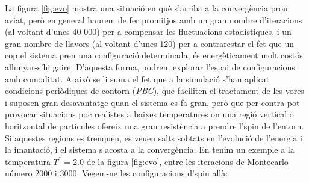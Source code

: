 \documentclass[a4paper]{article}
\begin{document}
La figura \ref{fig:evo} mostra una situació en què s'arriba a la convergència prou aviat, però en general haurem de fer promitjos amb un gran nombre d'iteracions (al voltant d'unes 40 000) per a compensar les fluctuacions estadístiques, i un gran nombre de llavors (al voltant d'unes 120) per a contrarestar el fet que un cop el sistema pren una configuració determinada, és energèticament molt costós allunyar-s'hi gaire. D'aquesta forma, podrem explorar l'espai de configuracions amb comoditat. A això se li suma el fet que a la simulació s'han aplicat condicions periòdiques de contorn (\textit{PBC}), que faciliten el tractament de les vores i suposen gran desavantatge quan el sistema es fa gran, però que per contra pot provocar situacions poc realistes a baixes temperatures on una regió vertical o horitzontal de partícules ofereix una gran resistència a prendre l'spin de l'entorn. Si aquestes regions es trenquen, es veuen salts sobtats en l'evolució de l'energia i la imantació, i el sistema s'acosta a la convergència. En tenim un exemple a la temperatura $T^* = 2.0$ de la figura \ref{fig:evo}, entre les iteracions de Montecarlo número 2000 i 3000. Vegem-ne les configuracions d'spin allà:
\end{document}
